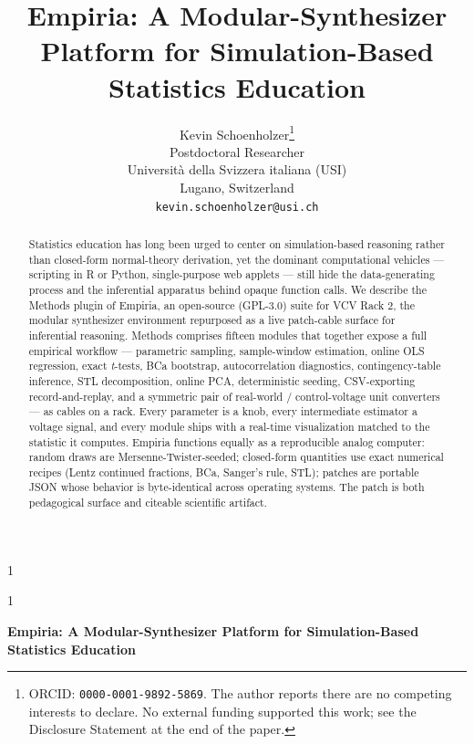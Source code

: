 \documentclass[12pt]{article}
\newcommand{\anon}{1}
\begin{document}
\def\spacingset#1{\renewcommand{\baselinestretch}{#1}\small\normalsize}
\spacingset{1}


\anon
{
  \title{\bf Empiria: A Modular-Synthesizer Platform for Simulation-Based Statistics Education}
  \author{Kevin Schoenholzer\thanks{ORCID: \texttt{0000-0001-9892-5869}. The author reports there are no competing interests to declare. No external funding supported this work; see the Disclosure Statement at the end of the paper.} \\
    Postdoctoral Researcher \\
    Universit\`a della Svizzera italiana (USI) \\
    Lugano, Switzerland \\
    \texttt{kevin.schoenholzer@usi.ch}}
  \maketitle
} \fi

\anon
{
  \bigskip
  \bigskip
  \bigskip
  \begin{center}
    {\LARGE\bf Empiria: A Modular-Synthesizer Platform for Simulation-Based Statistics Education}
  \end{center}
  \medskip
} \fi

\bigskip
\begin{abstract}
Statistics education has long been urged to center on simulation-based
reasoning rather than closed-form normal-theory derivation, yet the
dominant computational vehicles --- scripting in R or Python,
single-purpose web applets --- still hide the data-generating process
and the inferential apparatus behind opaque function calls. We describe
the Methods plugin of Empiria, an open-source (GPL-3.0) suite for VCV
Rack 2, the modular synthesizer environment repurposed as a live
patch-cable surface for inferential reasoning. Methods comprises fifteen
modules that together expose a full empirical workflow --- parametric
sampling, sample-window estimation, online OLS regression, exact
\textit{t}-tests, BCa bootstrap, autocorrelation diagnostics,
contingency-table inference, STL decomposition, online PCA,
deterministic seeding, CSV-exporting record-and-replay, and a symmetric
pair of real-world / control-voltage unit converters --- as cables on a
rack. Every parameter is a knob, every intermediate estimator a voltage
signal, and every module ships with a real-time visualization matched to
the statistic it computes. Empiria functions equally as a reproducible
analog computer: random draws are Mersenne-Twister-seeded; closed-form
quantities use exact numerical recipes (Lentz continued fractions, BCa,
Sanger's rule, STL); patches are portable JSON whose behavior is
byte-identical across operating systems. The patch is both pedagogical
surface and citeable scientific artifact.
\end{abstract}
\end{document}
